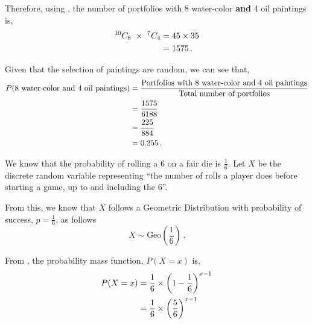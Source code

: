 \begin{subquestions}
\begin{subsubquestions}
Therefore, using , the number of portfolios with 8 water-color \textbf{and} 4 oil paintings is,
\begin{align}
	^{10}C_{8} ~\times ~ ^7C_{4} & = 45 \times 35 \nonumber \\
	                            & = 1575 \,.
\end{align}


\subsubquestion

Given that the selection of paintings are random, we can see that,
\begin{align}
	P(\text{8 water-color and 4 oil paintings}) & = \frac{\text{Portfolios with 8 water-color and 4 oil paintings}}{\text{Total number of portfolios}} \nonumber \\
	                                            & = \frac{1575}{6188} \nonumber \\
	                                            & = \frac{225}{884} \nonumber \\
	                                            & = 0.255 \,.
\end{align}

\end{subsubquestions}
	

\subquestion

We know that the probability of rolling a 6 on a fair die is $\frac{1}{6}$. Let $X$ be the discrete random variable representing ``the number of rolls a player does before starting a game, up to and including the 6''.

From this, we know that $X$ follows a Geometric Distribution with probability of success, $p=\frac{1}{6}$, as follows
\begin{equation}
	X \sim \text{Geo} \left(\frac{1}{6} \right) \,.
\end{equation}

\begin{subsubquestions}
	
\subquestion

From , the probability mass function, $P(X=x)$ is,
\begin{align}
	P(X = x) & = \frac{1}{6} \times \left(1-\frac{1}{6} \right)^{x-1} \nonumber \\
	         & = \frac{1}{6} \times \left(\frac{5}{6} \right)^{x-1}
\end{align}
	

\end{subsubquestions}
\end{subquestions}
